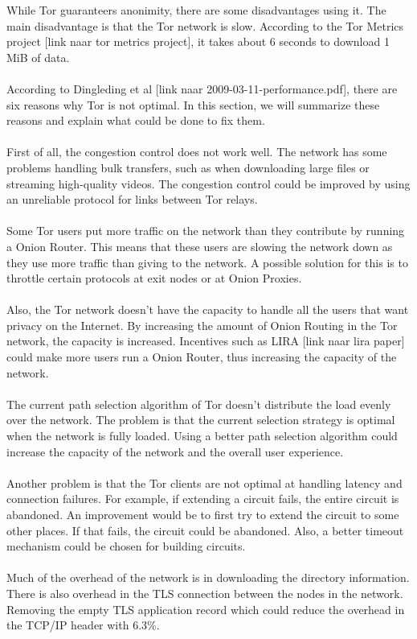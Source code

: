 \documentclass[journal]{IEEEtran}
\begin{document}
While Tor guaranteers anonimity, there are some disadvantages using it. The main disadvantage is that the Tor network is slow. According to the Tor Metrics project [link naar tor metrics project], it takes about 6 seconds to download 1 MiB of data.\\\\
According to Dingleding et al [link naar 2009-03-11-performance.pdf], there are six reasons why Tor is not optimal. In this section, we will summarize these reasons and explain what could be done to fix them.\\\\
First of all, the congestion control does not work well. The network has some problems handling bulk transfers, such as when downloading large files or streaming high-quality videos. The congestion control could be improved by using an unreliable protocol for links between Tor relays.\\\\
Some Tor users put more traffic on the network than they contribute by running a Onion Router. This means that these users are slowing the network down as they use more traffic than giving to the network. A possible solution for this is to throttle certain protocols at exit nodes or at Onion Proxies.\\\\
Also, the Tor network doesn’t have the capacity to handle all the users that want privacy on the Internet. By increasing the amount of Onion Routing in the Tor network, the capacity is increased. Incentives such as LIRA [link naar lira paper] could make more users run a Onion Router, thus increasing the capacity of the network.\\\\
The current path selection algorithm of Tor doesn’t distribute the load evenly over the network. The problem is that the current selection strategy is optimal when the network is fully loaded. Using a better path selection algorithm could increase the capacity of the network and the overall user experience.\\\\
Another problem is that the Tor clients are not optimal at handling latency and connection failures. For example, if extending a circuit fails, the entire circuit is abandoned. An improvement would be to first try to extend the circuit to some other places. If that fails, the circuit could be abandoned. Also, a better timeout mechanism could be chosen for building circuits.\\\\
Much of the overhead of the network is in downloading the directory information. There is also overhead in the TLS connection between the nodes in the network. Removing the empty TLS application record which could reduce the overhead in the TCP/IP header with 6.3\%.
		
\end{document}
